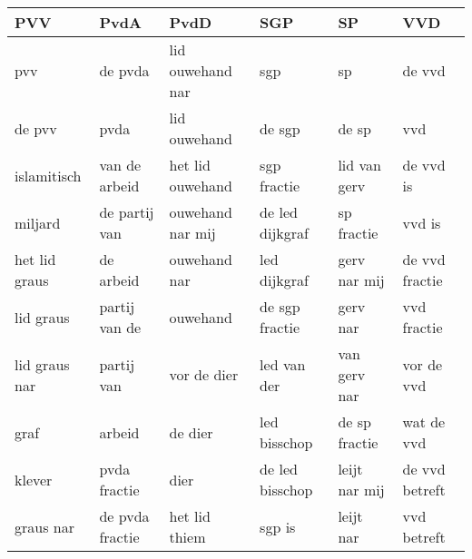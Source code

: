 \begin{tabular}{llllll}
\toprule
           PVV &             PvdA &              PvdD &              SGP &             SP &             VVD \\
\midrule
           pvv &          de pvda &  lid ouwehand nar &              sgp &             sp &          de vvd \\
        de pvv &             pvda &      lid ouwehand &           de sgp &          de sp &             vvd \\
   islamitisch &    van de arbeid &  het lid ouwehand &      sgp fractie &   lid van gerv &       de vvd is \\
       miljard &    de partij van &  ouwehand nar mij &  de led dijkgraf &     sp fractie &          vvd is \\
 het lid graus &        de arbeid &      ouwehand nar &     led dijkgraf &   gerv nar mij &  de vvd fractie \\
     lid graus &    partij van de &          ouwehand &   de sgp fractie &       gerv nar &     vvd fractie \\
 lid graus nar &       partij van &       vor de dier &      led van der &   van gerv nar &      vor de vvd \\
          graf &           arbeid &           de dier &     led bisschop &  de sp fractie &      wat de vvd \\
        klever &     pvda fractie &              dier &  de led bisschop &  leijt nar mij &  de vvd betreft \\
     graus nar &  de pvda fractie &     het lid thiem &           sgp is &      leijt nar &     vvd betreft \\
\bottomrule
\end{tabular}
